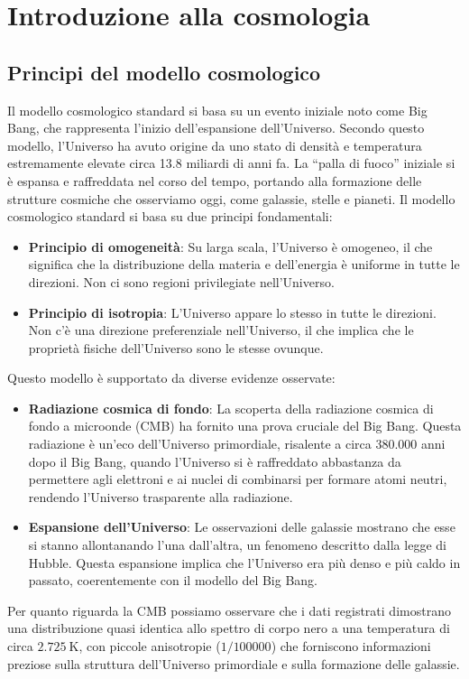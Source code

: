 \chapter[Cosmologia]{Introduzione alla cosmologia}
\section{Principi del modello cosmologico}
Il modello cosmologico standard si basa su un evento iniziale noto come Big Bang, che rappresenta l'inizio dell'espansione dell'Universo. Secondo questo modello, l'Universo ha avuto origine da uno stato di densità e temperatura estremamente elevate circa 13.8 miliardi di anni fa. La ``palla di fuoco'' iniziale si è espansa e raffreddata nel corso del tempo, portando alla formazione delle strutture cosmiche che osserviamo oggi, come galassie, stelle e pianeti.
Il modello cosmologico standard si basa su due principi fondamentali:
\begin{itemize}
    \item \textbf{Principio di omogeneità}: Su larga scala, l'Universo è omogeneo, il che significa che la distribuzione della materia e dell'energia è uniforme in tutte le direzioni. Non ci sono regioni privilegiate nell'Universo.
    \item \textbf{Principio di isotropia}: L'Universo appare lo stesso in tutte le direzioni. Non c'è una direzione preferenziale nell'Universo, il che implica che le proprietà fisiche dell'Universo sono le stesse ovunque.
\end{itemize}
Questo modello è supportato da diverse evidenze osservate:
\begin{itemize}
    \item \textbf{Radiazione cosmica di fondo}: La scoperta della radiazione cosmica di fondo a microonde (CMB) ha fornito una prova cruciale del Big Bang. Questa radiazione è un'eco dell'Universo primordiale, risalente a circa 380.000 anni dopo il Big Bang, quando l'Universo si è raffreddato abbastanza da permettere agli elettroni e ai nuclei di combinarsi per formare atomi neutri, rendendo l'Universo trasparente alla radiazione.
    \item \textbf{Espansione dell'Universo}: Le osservazioni delle galassie mostrano che esse si stanno allontanando l'una dall'altra, un fenomeno descritto dalla legge di Hubble. Questa espansione implica che l'Universo era più denso e più caldo in passato, coerentemente con il modello del Big Bang.
\end{itemize}
Per quanto riguarda la CMB possiamo osservare che i dati registrati dimostrano una distribuzione quasi identica allo spettro di corpo nero a una temperatura di circa $\qty{2.725}{\kelvin}$, con piccole anisotropie ($1/100000$) che forniscono informazioni preziose sulla struttura dell'Universo primordiale e sulla formazione delle galassie.\\
